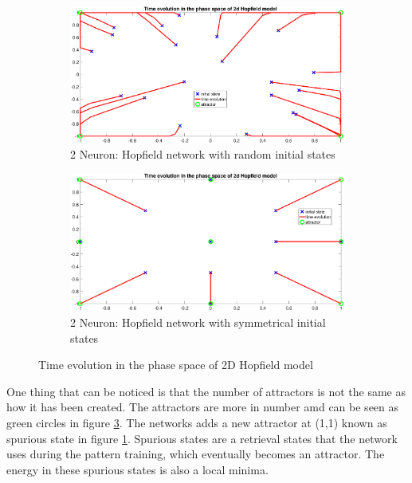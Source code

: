 \begin{figure}[!htpb]
	\centering
	\begin{subfigure}[b]{0.5\textwidth}
		\captionsetup{width=0.8\linewidth, format = hang}
		\includegraphics[height = 0.6\textwidth,width = 1\textwidth]{Exercise2/Report/hopfield_1}
		\caption{2 Neuron: Hopfield network with random initial states }\label{fig:hop1}
	\end{subfigure}%
	\begin{subfigure}[b]{0.5\textwidth}
		\captionsetup{width=0.8\linewidth, format = hang}
		\includegraphics[height = 0.6\textwidth,width = 1\textwidth]{Exercise2/Report/hopfield_3}
		\caption{2 Neuron: Hopfield network with symmetrical initial states}\label{fig:hop3}
	\end{subfigure}%
	\caption{Time evolution in the phase space of 2D Hopfield model }
	\label{fig:hop}
\end{figure}
One thing that can be noticed is that the number of attractors is not the same as how it has been created. The attractors are more in number amd can be seen as green circles in figure \ref{fig:hop}. The networks adds a new attractor at (1,1) known as spurious state in figure \ref{fig:hop1}. Spurious states are a retrieval states that the network uses during the pattern training, which eventually becomes an attractor. The energy in these spurious states is also a local minima. \\

